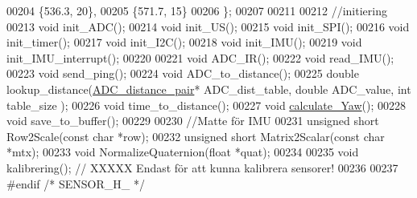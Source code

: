 \begin{DoxyCode}
00204     \{536.3, 20\},
00205     \{571.7, 15\}
00206 \};
00207 
00211 
00212 \textcolor{comment}{//initiering}
00213 \textcolor{keywordtype}{void} init\_ADC();
00214 \textcolor{keywordtype}{void} init\_US();
00215 \textcolor{keywordtype}{void} init\_SPI();
00216 \textcolor{keywordtype}{void} init\_timer();
00217 \textcolor{keywordtype}{void} init\_I2C();
00218 \textcolor{keywordtype}{void} init\_IMU();
00219 \textcolor{keywordtype}{void} init\_IMU\_interrupt();
00220 
00221 \textcolor{keywordtype}{void} ADC\_IR();
00222 \textcolor{keywordtype}{void} read\_IMU();
00223 \textcolor{keywordtype}{void} send\_ping();
00224 \textcolor{keywordtype}{void} ADC\_to\_distance();
00225 \textcolor{keywordtype}{double} lookup\_distance(\hyperlink{struct_a_d_c__distance__pair}{ADC\_distance\_pair}* ADC\_dist\_table, \textcolor{keywordtype}{double} ADC\_value, \textcolor{keywordtype}{int} table\_size
      );
00226 \textcolor{keywordtype}{void} time\_to\_distance();
00227 \textcolor{keywordtype}{void} \hyperlink{state__machine_8h_a5611f3fef1c7ebe6f76d952adf576e86}{calculate\_Yaw}();
00228 \textcolor{keywordtype}{void} save\_to\_buffer();
00229 
00230 \textcolor{comment}{//Matte för IMU}
00231 \textcolor{keywordtype}{unsigned} \textcolor{keywordtype}{short} Row2Scale(\textcolor{keyword}{const} \textcolor{keywordtype}{char} *row);
00232 \textcolor{keywordtype}{unsigned} \textcolor{keywordtype}{short} Matrix2Scalar(\textcolor{keyword}{const} \textcolor{keywordtype}{char} *mtx);
00233 \textcolor{keywordtype}{void} NormalizeQuaternion(\textcolor{keywordtype}{float} *quat);
00234 
00235 \textcolor{keywordtype}{void} kalibrering();     \textcolor{comment}{// XXXXX Endast för att kunna kalibrera sensorer!}
00236 
00237 \textcolor{preprocessor}{#endif }\textcolor{comment}{/* SENSOR\_H\_ */}\textcolor{preprocessor}{}
\end{DoxyCode}
